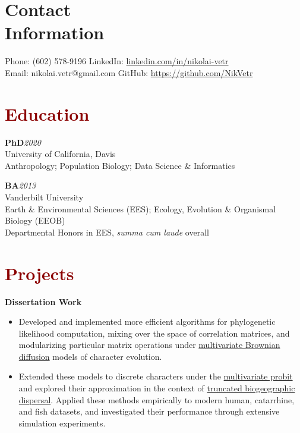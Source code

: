 \documentclass[11pt,margin,line]{resume}
\begin{document}
\name{\huge \textcolor{DarkRed}{Nikolai Vetr}}
\begin{resume}
\vspace{-2mm}
\section{\mysidestyle Contact\\Information}
    Phone: (602) 578-9196       \hfill LinkedIn: \url{linkedin.com/in/nikolai-vetr} \\
\noindent Email: nikolai.vetr@gmail.com  \hfill GitHub: \url{https://github.com/NikVetr} \vspace{0mm}\\\vspace{-4.5mm}

\section{\large\textcolor{DarkRed}{Education}}
   
\textbf{PhD}\hfill\emph{2020}\\
University of California, Davis\\
Anthropology; Population Biology; Data Science \& Informatics
\vspace{-0.25em}

\textbf{BA}\hfill\emph{2013}\\
Vanderbilt University\\
Earth \& Environmental Sciences (EES); Ecology, Evolution \& Organismal Biology (EEOB)\\
Departmental Honors in EES, \textit{summa cum laude} overall\\
\vspace{-1.25em}

\section{\large\textcolor{DarkRed}{Projects}}

\textbf{Dissertation Work}
\begin{itemize}[noitemsep]
\item Developed and implemented more efficient algorithms for phylogenetic likelihood computation, mixing over the space of correlation matrices, and modularizing particular matrix operations under \ul{multivariate Brownian diffusion} models of character evolution.
\item Extended these models to discrete characters under the \ul{multivariate probit} and explored their approximation in the context of \ul{truncated biogeographic dispersal}. Applied these methods empirically to modern human, catarrhine, and fish datasets, and investigated their performance through extensive simulation experiments. 
\end{itemize}


\end{resume}
\end{document}
